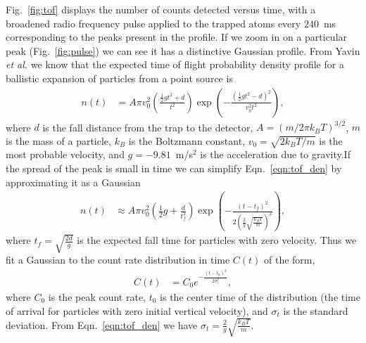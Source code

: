 \documentclass[%
 amsmath,amssymb,
aps,
]{revtex4-2}
\begin{document}
Fig.~\ref{fig:tof} displays the number of counts detected versus time, with a broadened radio frequency pulse applied to the trapped atoms every \(240\)~ms corresponding to the peaks present in the profile. If we zoom in on a particular peak (Fig.~\ref{fig:pulse}) we can see it has a distinctive Gaussian profile. 
From Yavin \textit{et al.} \cite{Yavin2002} we know that the expected time of flight probability density profile for a ballistic expansion of particles from a point source is
\begin{align}
    n(t) &= A \pi v_0^2 \left( \frac{\frac{1}{2}gt^2 + d }{t^2}\right) \exp \left( - \frac{(\frac{1}{2}gt^2 - d )^2}{v_0^2 t^2}\right), \label{eqn:tof_den_int}
\end{align}
where \(d\) is the fall distance from the trap to the detector, \(A = (m /2 \pi k_B T)^{3/2}\), \(m\) is the mass of a particle, \(k_B\) is the Boltzmann constant, \(v_0 = \sqrt{2 k_B T/m}\) is the most probable velocity, and \(g=-9.81\)~m/s\(^2\) is the acceleration due to gravity.If the spread of the peak is small in time we can simplify Eqn.~\ref{eqn:tof_den} by approximating it as a Gaussian
\begin{align}
    n(t) &\approx A \pi v_0^2 \left( \frac{1}{2}g + \frac{ d }{t_f^2}\right) \exp \left( - \frac{(t - t_f )^2}{ 2 \left(\frac{2}{g} \sqrt{\frac{k_B T}{m}}\right)^2}\right) \label{eqn:tof_den},
\end{align}
where \(t_f = \sqrt{\frac{2 d}{g}}\) is the expected fall time for particles with zero velocity.
Thus we fit a Gaussian to the count rate distribution in time \(C(t)\) of the form,
\begin{align}
    C(t) &= C_0 e^{-\frac{(t-t_0)^2}{2\sigma_t^2}},
\end{align}
where \(C_0\) is the peak count rate, \(t_0\) is the center time of the distribution (the time of arrival for particles with zero initial vertical velocity), and \(\sigma_t\) is the standard deviation. From Eqn.~\ref{eqn:tof_den} we have \(\sigma_t = \frac{2}{g} \sqrt{\frac{k_B T}{m}}\).
\end{document}
